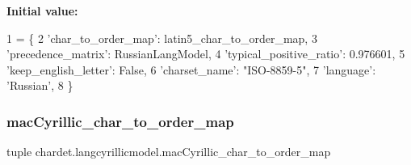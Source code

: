 {\bfseries Initial value\+:}
\begin{DoxyCode}
1 =  \{
2   \textcolor{stringliteral}{'char\_to\_order\_map'}: latin5\_char\_to\_order\_map,
3   \textcolor{stringliteral}{'precedence\_matrix'}: RussianLangModel,
4   \textcolor{stringliteral}{'typical\_positive\_ratio'}: 0.976601,
5   \textcolor{stringliteral}{'keep\_english\_letter'}: \textcolor{keyword}{False},
6   \textcolor{stringliteral}{'charset\_name'}: \textcolor{stringliteral}{"ISO-8859-5"},
7   \textcolor{stringliteral}{'language'}: \textcolor{stringliteral}{'Russian'},
8 \}
\end{DoxyCode}
\mbox{\label{namespacechardet_1_1langcyrillicmodel_a80de65a878a19cc925725146f78b2439}} 
\subsubsection{\texorpdfstring{mac\+Cyrillic\+\_\+char\+\_\+to\+\_\+order\+\_\+map}{macCyrillic\_char\_to\_order\_map}}
{\footnotesize\ttfamily tuple chardet.\+langcyrillicmodel.\+mac\+Cyrillic\+\_\+char\+\_\+to\+\_\+order\+\_\+map}

